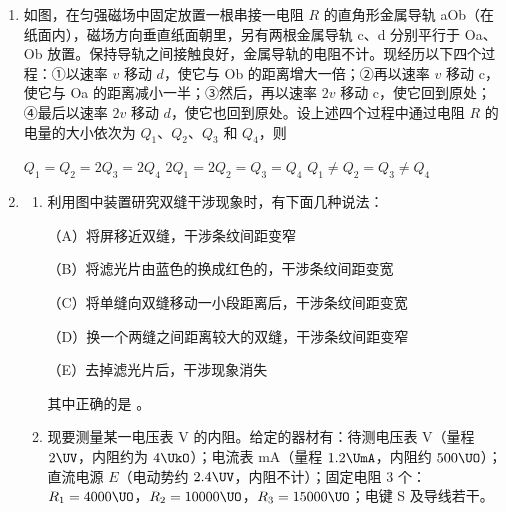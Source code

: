 \documentclass[\gkver]{gaokaozhenti}
\begin{document}
\begin{enumerate}
\item
如图，在匀强磁场中固定放置一根串接一电阻 $R$ 的直角形金属导轨 aOb（在纸面内），磁场方向垂直纸面朝里，另有两根金属导轨 c、d 分别平行于 Oa、Ob 放置。保持导轨之间接触良好，金属导轨的电阻不计。现经历以下四个过程：①以速率 $v$ 移动 $d$，使它与 Ob 的距离增大一倍；②再以速率 $v$ 移动 c，使它与 Oa 的距离减小一半；③然后，再以速率 $2v$ 移动 c，使它回到原处；④最后以速率 $2v$ 移动 $d$，使它也回到原处。设上述四个过程中通过电阻 $R$ 的电量的大小依次为 $Q_{1}$、$Q_{2}$、$Q_{3}$ 和 $Q_{4}$，则


{$Q_{1}=Q_{2}=2Q_{3}=2Q_{4}$}
{$2Q_{1}=2Q_{2}=Q_{3}=Q_{4}$}
{$Q_{1}\neq Q_{2}=Q_{3}\neq Q_{4}$}


\item
\begin{enumerate}
	\item
	利用图中装置研究双缝干涉现象时，有下面几种说法：


	（A）将屏移近双缝，干涉条纹间距变窄

	（B）将滤光片由蓝色的换成红色的，干涉条纹间距变宽

	（C）将单缝向双缝移动一小段距离后，干涉条纹间距变宽

	（D）换一个两缝之间距离较大的双缝，干涉条纹间距变窄

	（E）去掉滤光片后，干涉现象消失

	其中正确的是 。

	\item
	现要测量某一电压表 V 的内阻。给定的器材有：待测电压表 V（量程 $2\UV$，内阻约为 $4\UkO$）；电流表 mA（量程 $1.2\UmA$，内阻约 $500\UO$）；直流电源 $E$（电动势约 $2.4\UV$，内阻不计）；固定电阻 3 个：$R_{1}=4000\UO$，$R_{2}=10000\UO$，$R_{3}=15000\UO$；电键 S 及导线若干。


\end{enumerate}
\end{enumerate}
\end{document}
